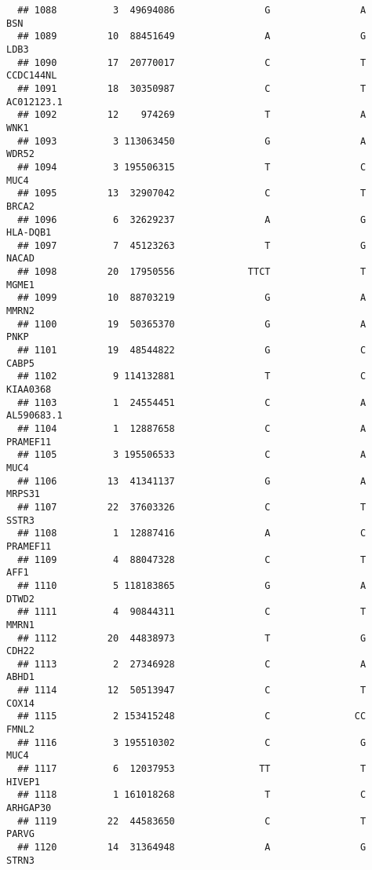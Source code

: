 \documentclass[12pt,twoside]{reedthesis}
\theoremstyle{definition}
\theoremstyle{definition}
\theoremstyle{remark}
\begin{document}
\begin{verbatim}
  ## 1088          3  49694086                G                A            BSN
  ## 1089         10  88451649                A                G           LDB3
  ## 1090         17  20770017                C                T      CCDC144NL
  ## 1091         18  30350987                C                T     AC012123.1
  ## 1092         12    974269                T                A           WNK1
  ## 1093          3 113063450                G                A          WDR52
  ## 1094          3 195506315                T                C           MUC4
  ## 1095         13  32907042                C                T          BRCA2
  ## 1096          6  32629237                A                G       HLA-DQB1
  ## 1097          7  45123263                T                G          NACAD
  ## 1098         20  17950556             TTCT                T          MGME1
  ## 1099         10  88703219                G                A          MMRN2
  ## 1100         19  50365370                G                A           PNKP
  ## 1101         19  48544822                G                C          CABP5
  ## 1102          9 114132881                T                C       KIAA0368
  ## 1103          1  24554451                C                A     AL590683.1
  ## 1104          1  12887658                C                A       PRAMEF11
  ## 1105          3 195506533                C                A           MUC4
  ## 1106         13  41341137                G                A         MRPS31
  ## 1107         22  37603326                C                T          SSTR3
  ## 1108          1  12887416                A                C       PRAMEF11
  ## 1109          4  88047328                C                T           AFF1
  ## 1110          5 118183865                G                A          DTWD2
  ## 1111          4  90844311                C                T          MMRN1
  ## 1112         20  44838973                T                G          CDH22
  ## 1113          2  27346928                C                A          ABHD1
  ## 1114         12  50513947                C                T          COX14
  ## 1115          2 153415248                C               CC          FMNL2
  ## 1116          3 195510302                C                G           MUC4
  ## 1117          6  12037953               TT                T         HIVEP1
  ## 1118          1 161018268                T                C       ARHGAP30
  ## 1119         22  44583650                C                T          PARVG
  ## 1120         14  31364948                A                G          STRN3

\end{verbatim}
\end{document}

